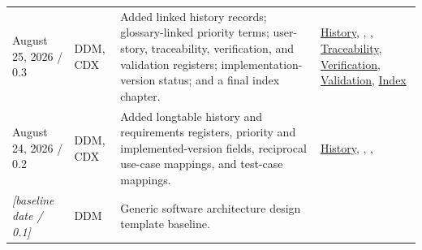 \begin{tabularx}{\linewidth}{L{3.1cm}L{2.2cm}YL{2.0cm}}
August 25, 2026 / 0.3 & DDM, CDX & Added linked history records; glossary-linked priority terms; user-story, traceability, verification, and validation registers; implementation-version status; and a final index chapter. & \hyperref[Table:DocumentHistory]{History}, , , \hyperref[Table:TraceabilityMatrix]{Traceability}, \hyperref[Table:VerificationRegister]{Verification}, \hyperref[Table:ValidationRegister]{Validation}, \hyperref[Chapter:Index]{Index}\\
August 24, 2026 / 0.2 & DDM, CDX & Added longtable history and requirements registers, priority and implemented-version fields, reciprocal use-case mappings, and test-case mappings. & \hyperref[Table:DocumentHistory]{History}, , , \\
\textit{[baseline date / 0.1]} & DDM & Generic software architecture design template baseline. & \\
\end{tabularx}
